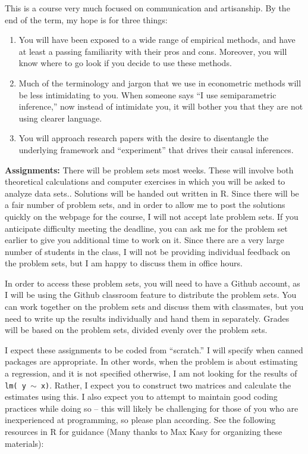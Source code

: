 \documentclass[11pt, a4paper]{article}
\begin{document}
This is a course very much focused on communication and
artisanship. By the end of the term, my hope is for three things:

\begin{enumerate}
\item You will have been exposed to a wide range of empirical methods,
  and have at least a passing familiarity with their pros and
  cons. Moreover, you will know where to go look if you decide to use
  these methods.
\item Much of the terminology and jargon that we use in econometric
  methods will be less intimidating to you. When someone says ``I use
  semiparametric inference,'' now instead of intimidate you, it will
  bother you that they are not using clearer language.
\item You will approach research papers with the desire to disentangle
  the underlying framework and ``experiment'' that drives their causal
  inferences.
\end{enumerate}

\noindent\textbf{Assignments:}
There will be problem sets most weeks. These will involve both
theoretical calculations and computer exercises in which you will be
asked to analyze data sets.. Solutions will be handed out written in R. Since there will be a fair number of problem sets, and in order to allow me to post the solutions quickly on the webpage for the course, I will not accept
late problem sets. If you anticipate difficulty meeting the deadline,
you can ask me for the problem set earlier to give you additional time
to work on it. Since there are a very large number of students in the class, I will not be providing individual feedback on the problem sets, but I am happy to discuss them in office hours.

In order to access these problem sets, you will need to have a Github account, as I will be using the Github classroom feature to distribute the problem sets. You can work together on the problem sets and discuss them with
classmates, but you need to write up the results individually and hand
them in separately. Grades will be based on the problem sets, divided
evenly over the problem sets.

I expect these assignments to be coded from ``scratch.'' I will
specify when canned packages are appropriate. In other words, when the problem is about estimating a regression, and it is not specified otherwise, I am not looking for the results of \texttt{lm( y $\sim$ x)}. Rather, I expect you to construct two matrices and calculate the estimates using this. I also expect you to attempt to maintain good coding practices while doing so -- this will
likely be challenging for those of you who are inexperienced at
programming, so please plan according. See
the following resources in R for guidance (Many thanks to Max Kasy for
organizing these materials):
\end{document}
